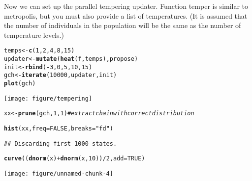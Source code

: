 \documentclass{article}\usepackage[]{graphicx}\usepackage[]{color}
\makeatletter
\def\maxwidth{ %
  \ifdim\Gin@nat@width>\linewidth
    \linewidth
  \else
    \Gin@nat@width
  \fi
}
\newcommand{\hlnum}[1]{\textcolor[rgb]{0.686,0.059,0.569}{#1}}%
\newcommand{\hlstr}[1]{\textcolor[rgb]{0.192,0.494,0.8}{#1}}%
\newcommand{\hlcom}[1]{\textcolor[rgb]{0.678,0.584,0.686}{\textit{#1}}}%
\newcommand{\hlopt}[1]{\textcolor[rgb]{0,0,0}{#1}}%
\newcommand{\hlstd}[1]{\textcolor[rgb]{0.345,0.345,0.345}{#1}}%
\newcommand{\hlkwb}[1]{\textcolor[rgb]{0.69,0.353,0.396}{#1}}%
\newcommand{\hlkwc}[1]{\textcolor[rgb]{0.333,0.667,0.333}{#1}}%
\newcommand{\hlkwd}[1]{\textcolor[rgb]{0.737,0.353,0.396}{\textbf{#1}}}%
\newenvironment{kframe}{%
 \def\at@end@of@kframe{}%
 \ifinner\ifhmode%
  \def\at@end@of@kframe{\end{minipage}}%
  \begin{minipage}{\columnwidth}%
 \fi\fi%
 \def\FrameCommand##1{\hskip\@totalleftmargin \hskip-\fboxsep
 \colorbox{shadecolor}{##1}\hskip-\fboxsep
     \hskip-\linewidth \hskip-\@totalleftmargin \hskip\columnwidth}%
 \MakeFramed {\advance\hsize-\width
   \@totalleftmargin\z@ \linewidth\hsize
   \@setminipage}}%
 {\par\unskip\endMakeFramed%
 \at@end@of@kframe}
\newenvironment{knitrout}{}{} %
\makeatother
\begin{document}
Now we can set up the parallel tempering updater. Function temper is similar to
metropolis, but you must also provide a list of temperatures. (It is
assumed that the number of individuals in the population will be the
same as the number of temperature levels.)
\begin{knitrout}
\color{fgcolor}\begin{kframe}
\begin{alltt}
\hlstd{temps} \hlkwb{<-} \hlkwd{c}\hlstd{(}\hlnum{1}\hlstd{,} \hlnum{2}\hlstd{,} \hlnum{4}\hlstd{,} \hlnum{8}\hlstd{,} \hlnum{15}\hlstd{)}
\hlstd{updater} \hlkwb{<-} \hlkwd{mutate}\hlstd{(}\hlkwd{heat}\hlstd{(f, temps), propose)}
\hlstd{init} \hlkwb{<-} \hlkwd{rbind}\hlstd{(}\hlopt{-}\hlnum{3}\hlstd{,} \hlnum{0}\hlstd{,} \hlnum{5}\hlstd{,} \hlnum{10}\hlstd{,} \hlnum{15}\hlstd{)}
\hlstd{gch} \hlkwb{<-} \hlkwd{iterate}\hlstd{(}\hlnum{10000}\hlstd{, updater, init)}
\hlkwd{plot}\hlstd{(gch)}
\end{alltt}
\end{kframe}
\texttt{[image: figure/tempering]} 
\begin{kframe}\begin{alltt}
\hlstd{xx} \hlkwb{<-} \hlkwd{prune}\hlstd{(gch,} \hlnum{1}\hlstd{,} \hlnum{1}\hlstd{)}  \hlcom{#extract chain with correct distribution}
\end{alltt}
\end{kframe}
\end{knitrout}

\begin{knitrout}
\color{fgcolor}\begin{kframe}
\begin{alltt}
\hlkwd{hist}\hlstd{(xx,} \hlkwc{freq} \hlstd{=} \hlnum{FALSE}\hlstd{,} \hlkwc{breaks} \hlstd{=} \hlstr{"fd"}\hlstd{)}
\end{alltt}
\begin{verbatim}
## Discarding first 1000 states.
\end{verbatim}
\begin{alltt}
\hlkwd{curve}\hlstd{((}\hlkwd{dnorm}\hlstd{(x)} \hlopt{+} \hlkwd{dnorm}\hlstd{(x,} \hlnum{10}\hlstd{))}\hlopt{/}\hlnum{2}\hlstd{,} \hlkwc{add} \hlstd{=} \hlnum{TRUE}\hlstd{)}
\end{alltt}
\end{kframe}
\texttt{[image: figure/unnamed-chunk-4]} 

\end{knitrout}
\end{document}

